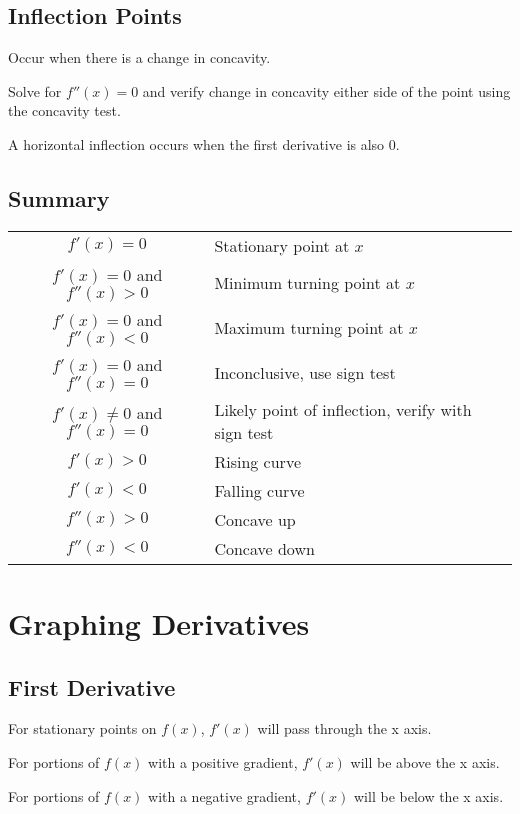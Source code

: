 \documentclass[a4paper,11pt]{article}
\begin{document}
\subsection{Inflection Points}

Occur when there is a change in concavity.

Solve for $f''(x) = 0$ and verify change in concavity either side of the point
using the concavity test.

A horizontal inflection occurs when the first derivative is also 0.


\subsection{Summary}

\begin{center}
\begin{tabular}{cl}
$f'(x) = 0$ & Stationary point at $x$ \\
$f'(x) = 0$ and $f''(x) > 0$ & Minimum turning point at $x$ \\
$f'(x) = 0$ and $f''(x) < 0$ & Maximum turning point at $x$ \\
$f'(x) = 0$ and $f''(x) = 0$ & Inconclusive, use sign test \\
$f'(x) \neq 0$ and $f''(x) = 0$ & Likely point of inflection, verify with sign test \\
$f'(x) > 0$ & Rising curve \\
$f'(x) < 0$ & Falling curve \\
$f''(x) > 0$ & Concave up \\
$f''(x) < 0$ & Concave down \\
\end{tabular}
\end{center}




\section{Graphing Derivatives}

\subsection{First Derivative}

For stationary points on $f(x)$, $f'(x)$ will pass through the x axis.

For portions of $f(x)$ with a positive gradient, $f'(x)$ will be above the x
axis.

For portions of $f(x)$ with a negative gradient, $f'(x)$ will be below the x
axis.
\end{document}
